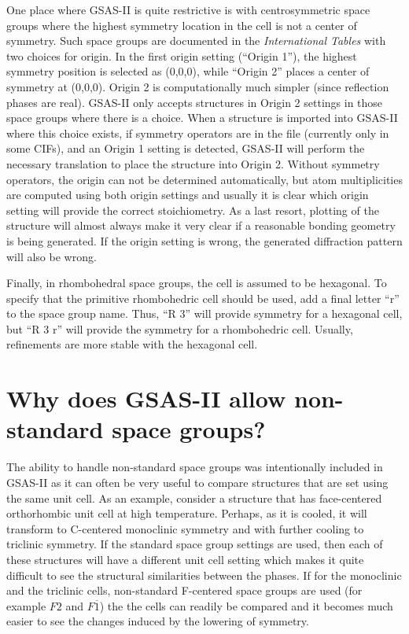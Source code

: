 One place where GSAS-II is quite restrictive is with centrosymmetric space groups where the highest symmetry location in the cell is not a center of symmetry. Such space groups are documented in the \textit{International Tables} with two choices for origin. In the first origin setting (``Origin 1'')\label{ref:origin1}, the highest symmetry position is selected as (0,0,0), while ``Origin 2'' places a center of symmetry at (0,0,0). Origin 2 is computationally much simpler (since reflection phases are real). GSAS-II only accepts structures in Origin 2 settings in those space groups where there is a choice. When a structure is imported into GSAS-II where this choice exists, if symmetry operators are in the file (currently only in some CIFs), and an Origin 1 setting is detected, GSAS-II will perform the necessary translation to place the structure into Origin 2. Without symmetry operators, the origin can not be determined automatically, but atom multiplicities are computed using both origin settings and usually it is clear which origin setting will provide the correct stoichiometry. As a last resort, plotting of the structure will almost always make it very clear if a reasonable bonding geometry is being generated. If the origin setting is wrong, the generated diffraction pattern will also be wrong. 

Finally, in rhombohedral space groups, the cell is assumed to be hexagonal. To specify that the primitive rhombohedric cell should be used, add a final letter ``r'' to the space group name. Thus, ``R 3'' will provide symmetry for a hexagonal cell, but ``R 3 r'' will provide the symmetry for a rhombohedric cell. Usually, refinements are more stable with the hexagonal cell. 

\section{Why does GSAS-II allow non-standard space groups?}\label{ref:nonstandardSG}
The ability to handle non-standard space groups was intentionally included in GSAS-II as it can often be very useful to compare structures that are set using the same unit cell. As an example, consider a structure that has face-centered orthorhombic unit cell at high temperature. Perhaps, as it is cooled, it will transform to C-centered monoclinic symmetry and with further cooling to triclinic symmetry. 
If the standard space group settings are used, then each of these structures will have a different unit cell setting which makes it quite difficult to see the structural similarities between the phases. If for the monoclinic and the triclinic cells, non-standard F-centered space groups are used (for example $F 2$ and $F \overline{1}$) the the cells can readily be compared and it becomes much easier to see the changes induced by the lowering of symmetry. 


